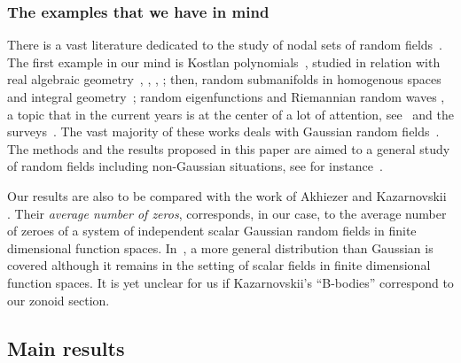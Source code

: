 \documentclass[10pt]{amsart}
\theoremstyle{definition}\newtheorem{defi}[theo]{Definition}\newtheorem{rema}[theo]{Remark}\newtheorem{exam}[theo]{Example}\newtheorem{exem}[theo]{Example}\newtheorem{nota}[theo]{Notation}
\begin{document}
\subsubsection{The examples that we have in mind}\label{subsub:exmind}

There is a vast literature dedicated to the study of nodal sets of random fields~\cite{AdlerTaylor, AzaisWscheborbook, bogachev,marinucci_peccati_2011}. The first example in our mind is Kostlan polynomials~\cite{kostlan:93}, studied in relation with real algebraic geometry~\cite{shsm,ShSm1,ShSm3}, \cite{GaWe1,GaWe3,GaWe2}, \cite{NazarovSodin2009,NazarovSodin2016}, \cite{breiding2018geometry,basu2019random,FyLeLu,
kozhasov2020number,LeLu:gap,
Lerariolemniscate,stec2019MaxTyp}; then, random submanifolds in homogenous spaces and integral geometry~\cite{bernig2014integral,Brgisser2016ProbabilisticSC,
lerario2021probabilistic}; random eigenfunctions and Riemannian random waves \cite{Berry_1977,Zelditch2009RealAC}, a topic that in the current years is at the center of a lot of attention, see~\cite{CaHa2020,CammarotaM2015,CamMari2018Berry,Gass2020, Wig2013arith,WigYesha2021,MAFFUCCI2017,MaPeRoWi2015, MaRoWi2020Berry,MarRossVidotto2021,
MaWi2011defect, MaWi2011excarea, MaWi2014,  NourdinPeccatiRossi2019, WigRud2016, SarnakWigman2019, 
Wigman_2010}
and the surveys~\cite{canzani2019probabilistic, Ma2021surveyECS,WigSurvey2010,WigSurvey2022}. The vast majority of these works deals with Gaussian random fields~\cite{bogachev,dtgrf,Nicolaescu2016, NazarovSodin2016, NicSavale, MaxNotarnickHermite}. The methods and the results proposed in this paper are aimed to a general study of random fields including non-Gaussian situations, see for instance~\cite{KabluSartoWig2022,stecconi2021isotropic}.

Our results are also to be compared with the work of Akhiezer and Kazarnovskii \cite{KazaAveragezeroes}. Their \emph{average number of zeros}, corresponds, in our case, to the average number of zeroes of a system of independent scalar Gaussian random fields in finite dimensional function spaces. In~\cite{Kazarnovskii2020}, a more general distribution than Gaussian is covered although it remains in the setting of scalar fields in finite dimensional function spaces. It is yet unclear for us if Kazarnovskii's ``B-bodies'' correspond to our zonoid section.


\subsection{Main results}
\end{document}
